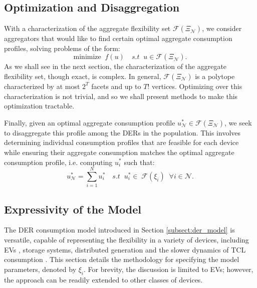 \subsection{Optimization and Disaggregation}
With a characterization of the aggregate flexibility set $\mathcal{F}(\Xi_\mathcal{N}) $, we consider aggregators that would like to find certain optimal aggregate consumption profiles, solving problems of the form:
\begin{equation}
    \textrm{minimize} \;\; f(u) \quad s.t \;\;u \in \mathcal{F}(\Xi_{\mathcal{N}}).
\end{equation}
As we shall see in the next section, the characterization of the aggregate flexibility set, though exact, is complex. In general, $\mathcal{F}(\Xi_\mathcal{N}) $ is a polytope characterized by at most $2^T$ facets and up to $T!$ vertices. Optimizing over this characterization is not trivial, and so we shall present methods to make this optimization tractable. 


Finally, given an optimal aggregate consumption profile $u_\mathcal{N}^* \in \mathcal{F}(\Xi_\mathcal{N})  $, we seek to disaggregate this profile among the DERs in the population. This involves determining individual consumption profiles that are feasible for each device while ensuring their aggregate consumption matches the optimal aggregate consumption profile, i.e. computing $u_i^*$ such that:
\begin{equation}\label{eq:disaggregation}
  u_\mathcal{N}^* = \sum_{i=1}^N u_i^* \quad s.t \;\; u_i^* \in \; \mathcal{F}(\xi_i) \;\; \forall i \in \mathcal{N}.
\end{equation}


\subsection{Expressivity of the Model}\label{subsect:expressivity}
The DER consumption model introduced in Section \ref{subsect:der_model} is versatile, capable of representing the flexibility in a variety of devices, including EVs \cite{Taha2024AnPopulations}, storage systems, distributed generation and the slower dynamics of TCL consumption \cite{Xu2016HierarchicalLoads}. This section details the methodology for specifying the model parameters, denoted by $\xi_i$. 
For brevity, the discussion is limited to EVs; however, the approach can be readily extended to other classes of devices.

